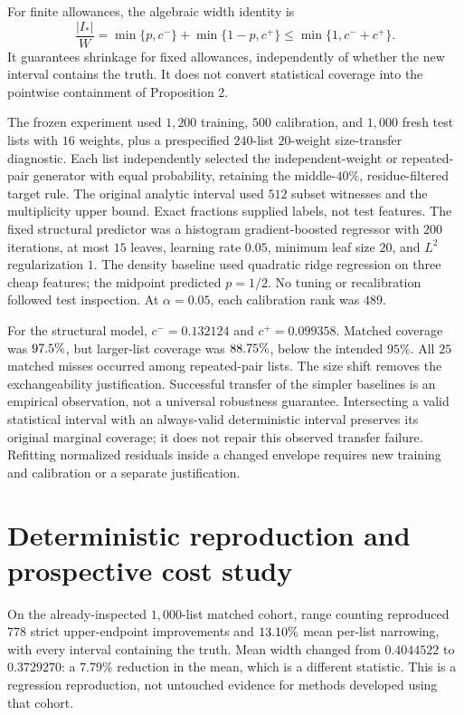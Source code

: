 \documentclass[10pt,english]{article}
\begin{document}
For finite allowances, the algebraic width identity is
\[
\frac{|I_*|}{W}=\min\{p,c^-\}+\min\{1-p,c^+\}
 \le\min\{1,c^-+c^+\}.
\]
It guarantees shrinkage for fixed allowances, independently of whether
the new interval contains the truth. It does not convert statistical
coverage into the pointwise containment of Proposition 2.

The frozen experiment used \(1{,}200\) training, \(500\) calibration,
and \(1{,}000\) fresh test lists with \(16\) weights, plus a
prespecified \(240\)-list \(20\)-weight size-transfer diagnostic.
Each list independently selected the independent-weight or repeated-pair
generator with equal probability, retaining the middle-\(40\%\),
residue-filtered target rule. The original analytic interval used
\(512\) subset witnesses and the multiplicity upper bound. Exact
fractions supplied labels, not test features. The fixed structural
predictor was a histogram gradient-boosted regressor with \(200\)
iterations, at most \(15\) leaves, learning rate \(0.05\), minimum
leaf size \(20\), and \(L^2\) regularization \(1\).
The density baseline used quadratic ridge regression on three cheap
features; the midpoint predicted \(p=1/2\). No tuning or recalibration
followed test inspection. At \(\alpha=0.05\), each calibration rank
was \(489\).

\begin{table}[htbp]
\centering
\caption{List-level calibrated refinement. Width removal is the mean
per-list fractional reduction on the matched \(n=16\) test.
The larger-list diagnostic uses the same fitted model and allowances.}
\small

\end{table}

For the structural model, \(c^-=0.132124\) and \(c^+=0.099358\).
Matched coverage was \(97.5\%\), but larger-list coverage
was \(88.75\%\), below the intended \(95\%\).
All \(25\) matched misses occurred among repeated-pair lists.
The size shift removes the exchangeability justification. Successful
transfer of the simpler baselines is an empirical observation, not a
universal robustness guarantee. Intersecting a valid statistical interval
with an always-valid deterministic interval preserves its original
marginal coverage; it does not repair this observed transfer failure.
Refitting normalized residuals inside a changed envelope requires new
training and calibration or a separate justification.

\section{Deterministic reproduction and prospective cost study}
On the already-inspected \(1{,}000\)-list matched cohort, range counting
reproduced \(778\) strict upper-endpoint improvements and
\(13.10\%\) mean per-list narrowing, with every
interval containing the truth. Mean width changed from \(0.4044522\)
to \(0.3729270\): a \(7.79\%\) reduction in the mean, which is a
different statistic. This is a regression reproduction, not untouched
evidence for methods developed using that cohort.
\end{document}
